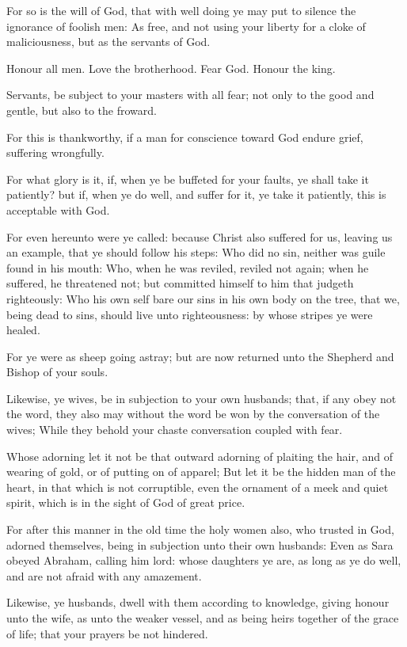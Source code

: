\Verse For so is the will of God, that with well doing ye may put to silence the ignorance of foolish men: \Verse As free, and not using your liberty for a cloke of maliciousness, but as the servants of God.

\Verse Honour all men. Love the brotherhood. Fear God. Honour the king.

\Verse Servants, be subject to your masters with all fear; not only to the good and gentle, but also to the froward.

\Verse For this is thankworthy, if a man for conscience toward God endure grief, suffering wrongfully.

\Verse For what glory is it, if, when ye be buffeted for your faults, ye shall take it patiently? but if, when ye do well, and suffer for it, ye take it patiently, this is acceptable with God.

\Verse For even hereunto were ye called: because Christ also suffered for us, leaving us an example, that ye should follow his steps: \Verse Who did no sin, neither was guile found in his mouth: \Verse Who, when he was reviled, reviled not again; when he suffered, he threatened not; but committed himself to him that judgeth righteously: \Verse Who his own self bare our sins in his own body on the tree, that we, being dead to sins, should live unto righteousness: by whose stripes ye were healed.

\Verse For ye were as sheep going astray; but are now returned unto the Shepherd and Bishop of your souls.


\Chapter
\Verse Likewise, ye wives, be in subjection to your own husbands; that, if any obey not the word, they also may without the word be won by the conversation of the wives; \Verse While they behold your chaste conversation coupled with fear.

\Verse Whose adorning let it not be that outward adorning of plaiting the hair, and of wearing of gold, or of putting on of apparel; \Verse But let it be the hidden man of the heart, in that which is not corruptible, even the ornament of a meek and quiet spirit, which is in the sight of God of great price.

\Verse For after this manner in the old time the holy women also, who trusted in God, adorned themselves, being in subjection unto their own husbands: \Verse Even as Sara obeyed Abraham, calling him lord: whose daughters ye are, as long as ye do well, and are not afraid with any amazement.

\Verse Likewise, ye husbands, dwell with them according to knowledge, giving honour unto the wife, as unto the weaker vessel, and as being heirs together of the grace of life; that your prayers be not hindered.

